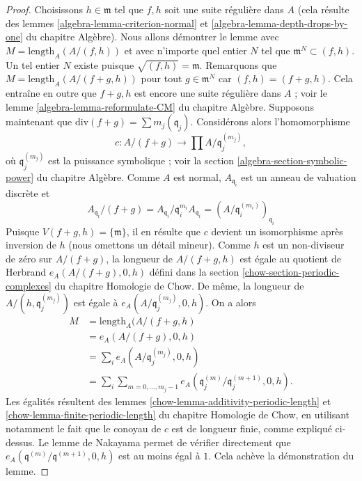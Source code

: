 \begin{proof}
Choisissons $h \in \mathfrak m$ tel que $f, h$ soit une suite régulière dans $A$
(cela résulte des lemmes \ref{algebra-lemma-criterion-normal} et
\ref{algebra-lemma-depth-drops-by-one} du chapitre Algèbre).
Nous allons démontrer le lemme avec $M = \text{length}_A(A/(f, h))$ et avec
n'importe quel entier $N$ tel que $\mathfrak m^N \subset (f, h)$. Un tel
entier $N$ existe puisque $\sqrt{(f, h)} = \mathfrak m$. Remarquons que
$M = \text{length}_A(A/(f + g, h))$ pour tout $g \in \mathfrak m^N$
car $(f, h) = (f + g, h)$. Cela entraîne en outre que $f + g, h$
est encore une suite régulière dans $A$ ; voir le lemme
\ref{algebra-lemma-reformulate-CM} du chapitre Algèbre.
Supposons maintenant que $\text{div}(f + g ) = \sum m_j (\mathfrak q_j)$.
Considérons alors l'homomorphisme
$$
c : A/(f + g) \longrightarrow \prod A/\mathfrak q_j^{(m_j)},
$$
où $\mathfrak q_j^{(m_j)}$ est la puissance symbolique ; voir la section
\ref{algebra-section-symbolic-power} du chapitre Algèbre.
Comme $A$ est normal, $A_{\mathfrak q_i}$ est un anneau de valuation discrète et
$$
A_{\mathfrak q_i}/(f + g) =
A_{\mathfrak q_i}/\mathfrak q_i^{m_i} A_{\mathfrak q_i} =
(A/\mathfrak q_i^{(m_i)})_{\mathfrak q_i}
$$
Puisque $V(f + g, h) = \{\mathfrak m\}$, il en résulte que $c$ devient
un isomorphisme après inversion de $h$ (nous omettons un détail mineur).
Comme $h$ est un non-diviseur de zéro sur $A/(f + g)$, la longueur de
$A/(f + g, h)$ est égale au quotient de Herbrand
$e_A(A/(f + g), 0, h)$ défini dans la section
\ref{chow-section-periodic-complexes} du chapitre Homologie de Chow.
De même, la longueur de $A/(h, \mathfrak q_j^{(m_j)})$ est égale à
$e_A(A/\mathfrak q_j^{(m_j)}, 0, h)$. On a alors
\begin{align*}
M & = \text{length}_A(A/(f + g, h) \\
& =
e_A(A/(f + g), 0, h) \\
& =
\sum\nolimits_i e_A(A/\mathfrak q_j^{(m_j)}, 0, h) \\
& =
\sum\nolimits_i \sum\nolimits_{m = 0, \ldots, m_j - 1}
e_A(\mathfrak q_j^{(m)}/\mathfrak q_j^{(m + 1)}, 0, h).
\end{align*}
Les égalités résultent des lemmes
\ref{chow-lemma-additivity-periodic-length} et
\ref{chow-lemma-finite-periodic-length} du chapitre Homologie de Chow,
en utilisant notamment le fait que
le conoyau de $c$ est de longueur finie, comme expliqué ci-dessus.
Le lemme de Nakayama permet de vérifier directement que
$e_A(\mathfrak q^{(m)}/\mathfrak q^{(m + 1)}, 0, h)$
est au moins égal à $1$. Cela achève la démonstration du lemme.
\end{proof}

